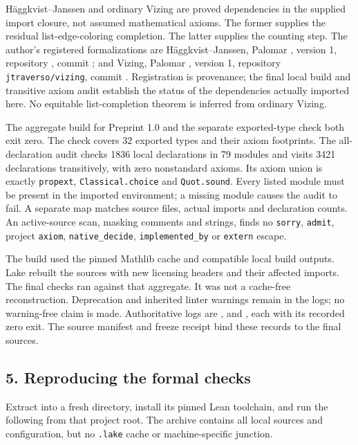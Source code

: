 \documentclass[english,11pt,a4paper]{article}
\begin{document}
Häggkvist--Janssen and ordinary Vizing are proved dependencies in the
supplied import closure, not assumed mathematical axioms. The former
supplies the residual list-edge-coloring completion. The latter supplies
the counting step. The author's registered formalizations are
Häggkvist--Janssen, Palomar , version
1, repository , commit
; and Vizing, Palomar
, version 1, repository
\texttt{jtraverso/vizing}, commit
. Registration is
provenance; the final local build and transitive axiom audit establish
the status of the dependencies actually imported here. No equitable
list-completion theorem is inferred from ordinary Vizing.

The aggregate build for Preprint 1.0 and the separate exported-type
check both exit zero. The check covers 32 exported types and their axiom
footprints. The all-declaration audit checks 1836 local declarations in
79 modules and visits 3421 declarations transitively, with zero
nonstandard axioms. Its axiom union is exactly \texttt{propext},
\texttt{Classical.choice} and \texttt{Quot.sound}. Every listed module
must be present in the imported environment; a missing module causes the
audit to fail. A separate map matches source files, actual imports and
declaration counts. An active-source scan, masking comments and strings,
finds no \texttt{sorry}, \texttt{admit}, project \texttt{axiom},
\texttt{native\_decide}, \texttt{implemented\_by} or \texttt{extern}
escape.

The build used the pinned Mathlib cache and compatible local build
outputs. Lake rebuilt the sources with new licensing headers and their
affected imports. The final checks ran against that aggregate. It was
not a cache-free reconstruction. Deprecation and inherited linter
warnings remain in the logs; no warning-free claim is made.
Authoritative logs are ,
 and
, each with its recorded
zero exit. The source manifest and freeze receipt bind these records to
the final sources.

\subsection{5. Reproducing the formal
checks}\label{reproducing-the-formal-checks}

Extract
into a fresh directory, install its pinned Lean toolchain, and run the
following from that project root. The archive contains all local sources
and configuration, but no \texttt{.lake} cache or machine-specific
junction.
\end{document}
